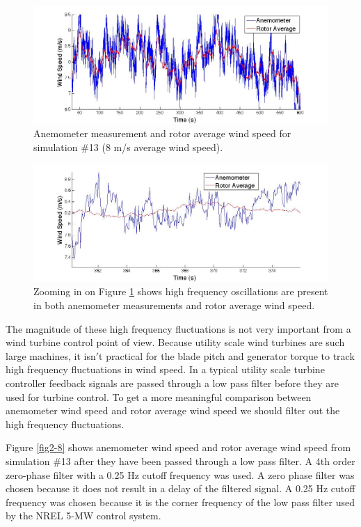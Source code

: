 \begin{figure}[htbp]
	\centering
		\includegraphics[width = \linewidth]{Figures/ch2Figures/fig2-6.jpg}
		
	\caption{Anemometer measurement and rotor average wind speed for simulation \#13 (8 m/s average wind speed).}
	\label{fig2-6}
\end{figure}


\begin{figure}[htbp]
	\centering
		\includegraphics[width = \linewidth]{Figures/ch2Figures/fig2-7.jpg}
	\caption{Zooming in on Figure \ref{fig2-6} shows high frequency oscillations are present in both anemometer measurements and rotor average wind speed.}
	\label{fig2-7}
\end{figure}

The magnitude of these high frequency fluctuations is not very important from a wind turbine control point of view. Because utility scale wind turbines are such large machines, it isn$'$t practical for the blade pitch and generator torque to track high frequency fluctuations in wind speed. In a typical utility scale turbine controller feedback signals are passed through a low pass filter before they are used for turbine control. To get a more meaningful comparison between anemometer wind speed and rotor average wind speed we should filter out the high frequency fluctuations.

Figure \ref{fig2-8} shows anemometer wind speed and rotor average wind speed from simulation \#13 after they have been passed through a low pass filter. A 4th order zero-phase filter with a 0.25 Hz cutoff frequency was used. A zero phase filter was chosen because it does not result in a delay of the filtered signal. A 0.25 Hz cutoff frequency was chosen because it is the corner frequency of the low pass filter used by the NREL 5-MW control system. 

